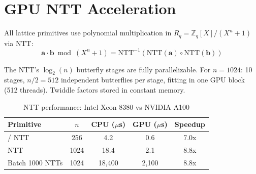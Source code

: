 \section{GPU NTT Acceleration}


All lattice primitives use polynomial multiplication in $R_q = \mathbb{Z}_q[X]/(X^n + 1)$ via NTT:
\begin{equation}
\mathbf{a} \cdot \mathbf{b} \bmod (X^n + 1) = \text{NTT}^{-1}(\text{NTT}(\mathbf{a}) \circ \text{NTT}(\mathbf{b}))
\end{equation}

The NTT's $\log_2(n)$ butterfly stages are fully parallelizable. For $n = 1024$: 10 stages, $n/2 = 512$ independent butterflies per stage, fitting in one GPU block (512 threads). Twiddle factors stored in constant memory.

\begin{table}[h]
\centering
\begin{tabular}{lcccc}
\toprule
\textbf{Primitive} & \textbf{$n$} & \textbf{CPU ($\mu$s)} & \textbf{GPU ($\mu$s)} & \textbf{Speedup} \\
\midrule
\MLKEM{} / \MLDSA{} NTT & 256 & 4.2 & 0.6 & 7.0x \\
\Ringtail{} NTT & 1024 & 18.4 & 2.1 & 8.8x \\
Batch 1000 \Ringtail{} NTTs & 1024 & 18,400 & 2,100 & 8.8x \\
\bottomrule
\end{tabular}
\caption{NTT performance: Intel Xeon 8380 vs NVIDIA A100}
\label{tab:ntt-perf}
\end{table}

